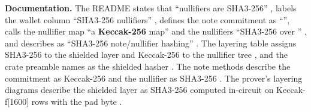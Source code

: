 \begin{specdelta}
\label{delta:hash}
\textbf{Documentation.} The README states that ``nullifiers are SHA3-256''
, labels the wallet column ``SHA3-256 nullifiers''
, defines the note commitment as
``'', calls the
nullifier map ``a \textbf{Keccak-256} map'' and the nullifiers ``SHA3-256 over
'' , and describes
 as ``SHA3-256 note/nullifier hashing''
. The  layering table assigns SHA3-256 to the
shielded layer and Keccak-256 to the nullifier tree
, and the crate preamble names
 as the shielded hasher
. The note methods describe the
commitment as Keccak-256 and the nullifier as SHA3-256
. The prover's layering
diagrams describe the shielded layer as SHA3-256 computed in-circuit on
Keccak-f[1600] rows with the  pad byte
.


\end{specdelta}
